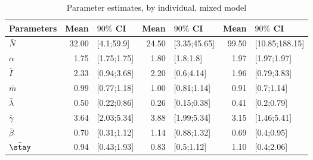 \begin{table}

\caption{Parameter estimates, by individual, mixed model}
\centering
\begin{tabular}[t]{lrlrlrl}
\toprule
Parameters & Mean & $90\%$ CI & Mean & $90\%$ CI & Mean & $90\%$ CI\\
\midrule
$\bar{N}$ & 32.00 & {}[4.1;59.9] & 24.50 & {}[3.35;45.65] & 99.50 & {}[10.85;188.15]\\
$\alpha$ & 1.75 & {}[1.75;1.75] & 1.80 & {}[1.8;1.8] & 1.97 & {}[1.97;1.97]\\
$\bar{I}$ & 2.33 & {}[0.94;3.68] & 2.20 & {}[0.6;4.14] & 1.96 & {}[0.79;3.83]\\
$\bar{m}$ & 0.99 & {}[0.77;1.18] & 1.00 & {}[0.81;1.14] & 0.91 & {}[0.7;1.14]\\
$\bar{\lambda}$ & 0.50 & {}[0.22;0.86] & 0.26 & {}[0.15;0.38] & 0.41 & {}[0.2;0.79]\\
\addlinespace
$\bar{\gamma}$ & 3.64 & {}[2.03;5.34] & 3.88 & {}[1.99;5.34] & 3.15 & {}[1.46;5.41]\\
$\bar{\beta}$ & 0.70 & {}[0.31;1.12] & 1.14 & {}[0.88;1.32] & 0.69 & {}[0.4;0.95]\\
$\bar{\stay}$ & 0.94 & {}[0.43;1.93] & 0.83 & {}[0.5;1.12] & 1.10 & {}[0.4;2.06]\\
\bottomrule
\end{tabular}
\end{table}
